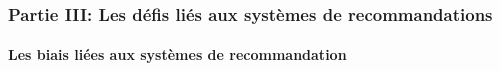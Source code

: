 \begin{frame}

    \frametitle{Partie III: Les défis liés aux systèmes de recommandations}
    \framesubtitle{Les biais liées aux systèmes de recommandation}

    \begin{figure}
        \centering
    \end{figure}

\end{frame}